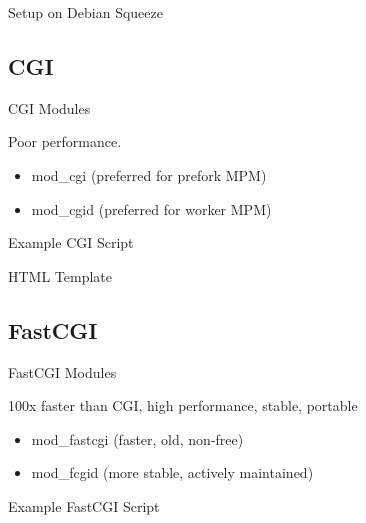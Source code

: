 \documentclass{beamer}
\begin{document}
\begin{frame}[containsverbatim]{Setup on Debian Squeeze}
  
  
\end{frame}

\subsection{CGI}

\begin{frame}[containsverbatim]{CGI Modules}
  \begin{center}
Poor performance.
  \end{center}
  \begin{itemize}
    \item mod\_cgi   (preferred for prefork MPM)
    \item mod\_cgid  (preferred for worker MPM)
  \end{itemize}
\end{frame}

\begin{frame}[containsverbatim]{Example CGI Script}

\end{frame}

\begin{frame}[containsverbatim]{HTML Template}

\end{frame}

\subsection{FastCGI}

\begin{frame}{FastCGI Modules}
  \begin{center}
100x faster than CGI, high performance, stable, portable
  \end{center}
  \begin{itemize}
    \item mod\_fastcgi (faster, old, non-free)
    \item mod\_fcgid   (more stable, actively maintained)
  \end{itemize}
\end{frame}

\begin{frame}[containsverbatim]{Example FastCGI Script}

\end{frame}
\end{document}
